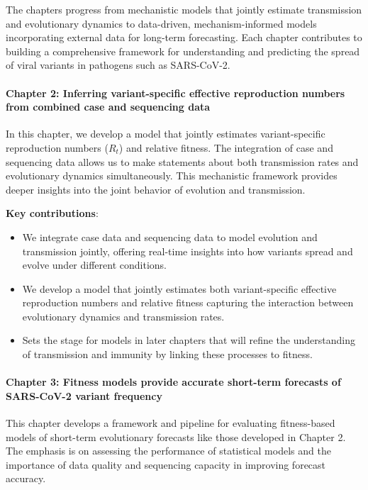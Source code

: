 The chapters progress from mechanistic models that jointly estimate transmission and evolutionary dynamics to data-driven, mechanism-informed models incorporating external data for long-term forecasting. 
Each chapter contributes to building a comprehensive framework for understanding and predicting the spread of viral variants in pathogens such as SARS-CoV-2.

\paragraph{Chapter 2: Inferring variant-specific effective reproduction numbers from combined case and sequencing data}

In this chapter, we develop a model that jointly estimates variant-specific reproduction numbers ($R_t$) and relative fitness.
The integration of case and sequencing data allows us to make statements about both transmission rates and evolutionary dynamics simultaneously.
This mechanistic framework provides deeper insights into the joint behavior of evolution and transmission.

\noindent\textbf{Key contributions}:
\begin{itemize}
  \item We integrate case data and sequencing data to model evolution and transmission jointly, offering real-time insights into how variants spread and evolve under different conditions.
  \item We develop a model that jointly estimates both variant-specific effective reproduction numbers and relative fitness capturing the interaction between evolutionary dynamics and transmission rates.
  \item Sets the stage for models in later chapters that will refine the understanding of transmission and immunity by linking these processes to fitness.
\end{itemize}

\paragraph{Chapter 3: Fitness models provide accurate short-term forecasts of SARS-CoV-2 variant frequency}

This chapter develops a framework and pipeline for evaluating fitness-based models of short-term evolutionary forecasts like those developed in Chapter 2.
The emphasis is on assessing the performance of statistical models and the importance of data quality and sequencing capacity in improving forecast accuracy.

